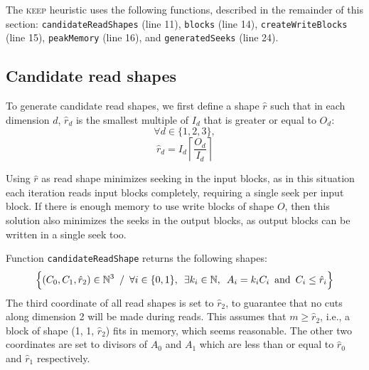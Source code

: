 \documentclass[sigconf, nonacm]{acmart}
\newcommand{\keep}[0]{\textsc{keep}\xspace}
\begin{document}
The \keep heuristic uses the following functions, described in the
remainder of this section: \texttt{candidateReadShapes} (line 11),
\texttt{blocks} (line 14), \texttt{createWriteBlocks} (line 15),
\texttt{peakMemory} (line 16), and
\texttt{generatedSeeks} (line 24).

\subsection{Candidate read shapes}


To generate candidate read shapes, we first define a shape $\hat r$ such
that in each dimension $d$, $\hat r_d$ is the smallest multiple of $I_d$
that is greater or equal to $O_d$:
\[
\forall d \in \{1, 2, 3\},
\]
\[
  \hat r_d = I_d \left \lceil \frac{O_d}{I_d} \right \rceil
\]

Using $\hat r$ as read shape minimizes seeking in the input blocks, as
in this situation each iteration reads input blocks completely, requiring a
single seek per input block. If there is enough memory to use write blocks
of shape $O$, then this solution also minimizes the seeks in the output
blocks, as output blocks can be written in a single seek too.

Function \texttt{candidateReadShape} returns the following shapes:
\[
  \Big\{ (C_0, C_1, \hat r_2) \in \mathbb{N}^3 \enskip / \enskip
          \forall i \in \{0, 1\}, \enskip \exists k_i \in \mathbb{N}, \enskip
           A_i = k_iC_i \enskip \mathrm{and} \enskip C_i \leq \hat r_i \Big\}
\]
The third coordinate of all read shapes is set to $\hat r_2$, to guarantee
that no cuts along dimension 2 will be made during reads. This assumes that
$m \geq \hat r_2$, i.e., a block of shape (1, 1, $\hat r_2$) fits in
memory, which seems reasonable. The other two coordinates are set to divisors of $A_0$ and $A_1$ which are
less than or equal to $\hat r_0$ and $\hat r_1$ respectively.
\end{document}
